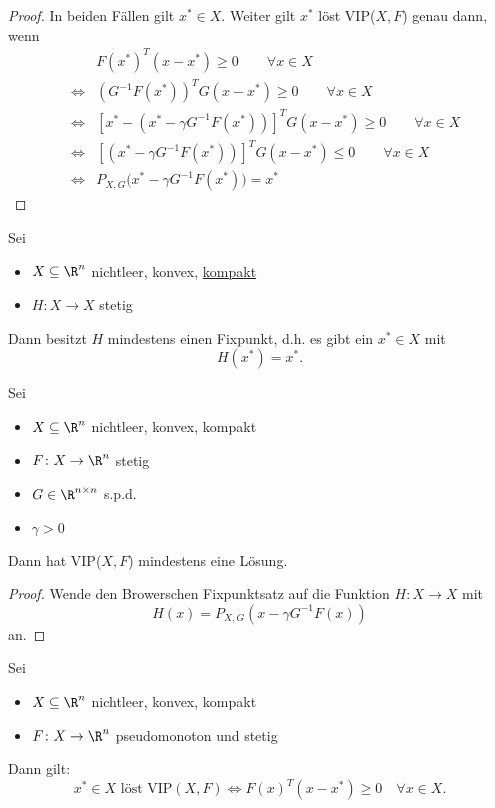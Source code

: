 \begin{proof}
	In beiden Fällen gilt ${x}^{*}\in X$. Weiter gilt ${x}^{*}$ löst VIP($X,F$) genau dann, wenn
	\begin{align*}
		&&F({x}^{*})^{T}(x-{x}^{*}) \geq 0 \qquad \forall x \in X \\
		&\iff &
		(G^{-1}F({x}^{*}))^{T}G(x-{x}^{*}) \geq  0 \qquad \forall x \in X \\
			 &\iff &
		\left[ {x}^{*} - ({x}^{*} - \gamma  G^{-1}F({x}^{*})) \right] ^{T} G(x-{x}^{*}) \geq 0 \qquad \forall x \in X \\
			 &\iff&
			 \left[ ({x}^{*}-\gamma  G^{-1}F({x}^{*})) \right] ^{T} G(x-{x}^{*}) \leq  0 \qquad \forall x \in X \\
			 &\iff&
			 P_{X,G}\Big({x}^{*}-\gamma  G^{-1}F({x}^{*})\Big) = {x}^{*}
	\end{align*}
\end{proof}

\begin{satz}
	Sei
	\begin{itemize}
		\item $X\subseteq \R^{n}$ nichtleer, konvex, \underline{kompakt}
		\item $H \colon X \rightarrow X $ stetig
	\end{itemize}
	Dann besitzt $H$ mindestens einen Fixpunkt, d.h. es gibt ein ${x}^{*}\in X$ mit 
	\[
		H({x}^{*}) = {x}^{*}
	.\] 
\end{satz}

\begin{satz}
	Sei
	\begin{itemize}
		\item $X \subseteq \R^{n}$ nichtleer, konvex, kompakt
		\item $F \colon X \rightarrow \R^{n} $ stetig
		\item $G \in \R^{n \times n}$ s.p.d.
		\item $\gamma > 0$
	\end{itemize}
	Dann hat VIP($X,F$) mindestens eine Lösung.
\end{satz}

\begin{proof}
	Wende den Browerschen Fixpunktsatz auf die Funktion $H \colon X \rightarrow X $ mit
	\[
		H(x) = P_{X,G}(x-\gamma G^{-1}F(x))
	\] 
	an.
\end{proof}

\begin{lemma}
	Sei
	\begin{itemize}
		\item $X \subseteq \R^{n}$ nichtleer, konvex, kompakt
		\item $F \colon X \rightarrow \R^{n} $ pseudomonoton und stetig
	\end{itemize}
	Dann gilt:
	\[
		{x}^{*} \in X \text{ löst VIP}(X,F) \iff F(x)^{T}(x-{x}^{*}) \geq  0 \quad \forall x \in X
	.\] 
\end{lemma}

